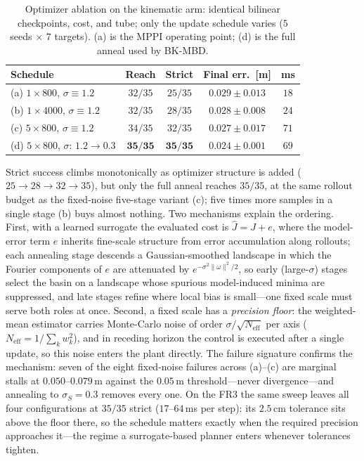 \documentclass[lettersize,journal]{IEEEtran}
\theoremstyle{remark}
\newcommand{\bkmbd}{\textsc{BK-MBD}}
\begin{document}
\begin{table}[t]
\centering
\caption{Optimizer ablation on the kinematic arm: identical bilinear
checkpoints, cost, and tube; only the update schedule varies ($5$ seeds
$\times$ $7$ targets). (a) is the MPPI operating point; (d) is the full
anneal used by \bkmbd{}.}
\label{tab:anneal}
\begin{tabular}{lcccc}
\hline
Schedule & Reach & Strict & Final err.\ [m] & ms \\
\hline
(a) $1{\times}800$, $\sigma{\equiv}1.2$ & $32/35$ & $25/35$ & $0.029 \pm 0.013$ & $18$ \\
(b) $1{\times}4000$, $\sigma{\equiv}1.2$ & $32/35$ & $28/35$ & $0.028 \pm 0.008$ & $24$ \\
(c) $5{\times}800$, $\sigma{\equiv}1.2$ & $34/35$ & $32/35$ & $0.027 \pm 0.017$ & $71$ \\
(d) $5{\times}800$, $\sigma{:}\,1.2{\to}0.3$ & $\mathbf{35/35}$ & $\mathbf{35/35}$ & $\mathbf{0.024 {\pm} 0.001}$ & $69$ \\
\hline
\end{tabular}
\end{table}

Strict success climbs monotonically as optimizer structure is added
($25 \to 28 \to 32 \to 35$), but only the full anneal reaches $35/35$,
at the same rollout budget as the fixed-noise five-stage variant (c);
five times more samples in a single stage (b) buys almost nothing.
Two mechanisms explain the ordering.
First, with a learned surrogate the evaluated cost is
$\hat J = J + e$, where the model-error term $e$ inherits fine-scale
structure from error accumulation along rollouts; each annealing stage
descends a Gaussian-smoothed landscape in which the Fourier components
of $e$ are attenuated by $e^{-\sigma^{2}\|\omega\|^{2}/2}$, so early
(large-$\sigma$) stages select the basin on a landscape whose spurious
model-induced minima are suppressed, and late stages refine where local
bias is small---one fixed scale must serve both roles at once.
Second, a fixed scale has a \emph{precision floor}: the weighted-mean
estimator carries Monte-Carlo noise of order
$\sigma/\sqrt{N_{\mathrm{eff}}}$ per axis
($N_{\mathrm{eff}} = 1/\sum_k w_k^{2}$), and in receding horizon the
control is executed after a single update, so this noise enters the
plant directly.
The failure signature confirms the mechanism: seven of the eight
fixed-noise failures across (a)--(c) are marginal stalls at
$0.050$--$0.079$\,m against the $0.05$\,m threshold---never
divergence---and annealing to $\sigma_S = 0.3$ removes every one.
On the FR3 the same sweep leaves all four configurations at $35/35$
strict ($17$--$64$\,ms per step): its $2.5$\,cm tolerance sits above the
floor there, so the schedule matters exactly when the required precision
approaches it---the regime a surrogate-based planner enters whenever
tolerances tighten.
\end{document}
